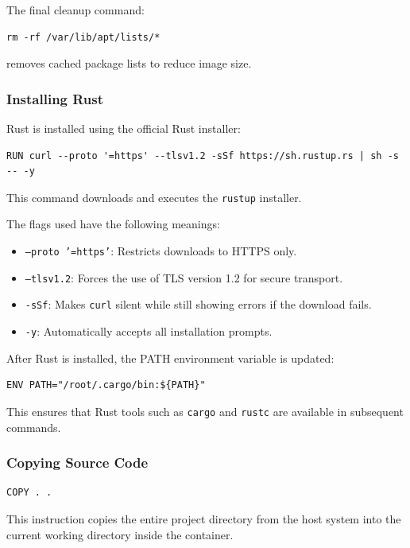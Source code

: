 \documentclass[11pt,a4paper]{article}
\begin{document}
The final cleanup command:

\begin{verbatim}
rm -rf /var/lib/apt/lists/*
\end{verbatim}

removes cached package lists to reduce image size.

\subsubsection{Installing Rust}

Rust is installed using the official Rust installer:

\begin{verbatim}
RUN curl --proto '=https' --tlsv1.2 -sSf https://sh.rustup.rs | sh -s -- -y
\end{verbatim}

This command downloads and executes the \texttt{rustup} installer.

The flags used have the following meanings:

\begin{itemize}
    \item \texttt{--proto '=https'}: Restricts downloads to HTTPS only.
    \item \texttt{--tlsv1.2}: Forces the use of TLS version 1.2 for secure transport.
    \item \texttt{-sSf}: Makes \texttt{curl} silent while still showing errors if the download fails.
    \item \texttt{-y}: Automatically accepts all installation prompts.
\end{itemize}

After Rust is installed, the PATH environment variable is updated:

\begin{verbatim}
ENV PATH="/root/.cargo/bin:${PATH}"
\end{verbatim}

This ensures that Rust tools such as \texttt{cargo} and \texttt{rustc} are available in subsequent commands.

\subsubsection{Copying Source Code}

\begin{verbatim}
COPY . .
\end{verbatim}

This instruction copies the entire project directory from the host system into the current working directory inside the container.
\end{document}
